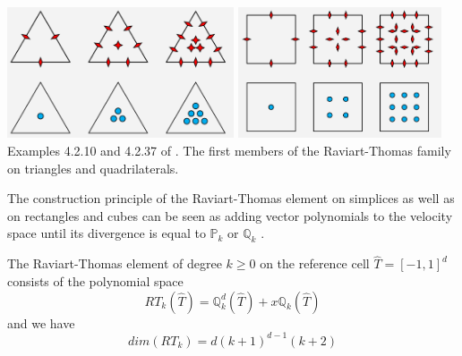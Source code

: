 \begin{itemize}
\begin{displayquote}
{\begin{center}
\includegraphics[width=6.7cm]{images/pair_raviart-thomas/RT_kanschat_T}
\includegraphics[width=6cm]{images/pair_raviart-thomas/RT_kanschat_Q}\\
{\captionfont Examples 4.2.10 and 4.2.37 of \textcite{kanschat17}.
The first members of the Raviart-Thomas family on triangles and quadrilaterals.
}
\end{center}

The construction principle of the Raviart-Thomas element on simplices as well
as on rectangles and cubes can be seen as adding vector polynomials to the
velocity space until its divergence is equal to ${\mathbb P}_k$ or ${\mathbb Q}_k$ .

The Raviart-Thomas element of degree $k\ge 0$
on the reference cell $\hat{T}=[-1,1]^d$ consists of the polynomial space
\[
RT_k(\hat{T}) = {\mathbb Q}_k^d(\hat{T}) + x {\mathbb Q}_k(\hat{T})
\]
and we have
\[
dim(RT_k) = d(k+1)^{d-1}(k+2)
\]

}
\end{displayquote}


\end{itemize}
